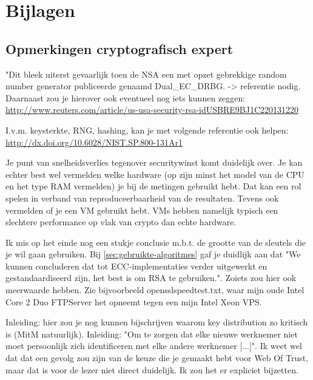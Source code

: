 \chapter{Bijlagen}

\section{Opmerkingen cryptografisch expert}
\label{sec:opmerkingen-cryptografisch-expert}

"Dit bleek uiterst gevaarlijk toen de NSA een met opzet gebrekkige random
number generator publiceerde genaamd Dual\_EC\_DRBG. -> referentie nodig.
Daarnaast zou je hierover ook eventueel nog iets kunnen zeggen:
\url{http://www.reuters.com/article/us-usa-security-rsa-idUSBRE9BJ1C220131220}

I.v.m. keysterkte, RNG, hashing, kan je met volgende referentie ook helpen:
\url{http://dx.doi.org/10.6028/NIST.SP.800-131Ar1}

Je punt van snelheidsverlies tegenover securitywinst komt duidelijk over. Je
kan echter best wel vermelden welke hardware (op zijn minst het model van de
CPU en het type RAM vermelden) je bij de metingen gebruikt hebt. Dat kan een
rol spelen in verband van reproduceerbaarheid van de resultaten. Tevens ook
vermelden of je een VM gebruikt hebt. VMs hebben namelijk typisch een slechtere
performance op vlak van crypto dan echte hardware.

Ik mis op het einde nog een stukje conclusie m.b.t. de grootte van de sleutels
die je wil gaan gebruiken. Bij \ref{sec:gebruikte-algoritmes} gaf je duidlijk
aan dat "We kunnen  concluderen dat tot ECC-implementaties verder uitgewerkt en
gestandaardiseerd zijn, het best is om RSA te gebruiken.". Zoiets zou hier ook
meerwaarde hebben. Zie bijvoorbeeld opensslspeedtest.txt, waar mijn oude Intel
Core 2 Duo FTPServer het opneemt tegen een mijn Intel Xeon VPS.

Inleiding: hier zou je nog kunnen bijschrijven waarom key distribution zo
kritisch is (MitM natuurlijk).
Inleiding: "Om te zorgen dat elke nieuwe werknemer niet moet persoonlijk zich
identificeren met elke andere werknemer [...]". Ik weet wel dat dat een gevolg
zou zijn van de keuze die je gemaakt hebt voor Web Of Trust, maar dat is voor
de lezer niet direct duidelijk. Ik zou het er expliciet bijzetten.

\subsection{}

